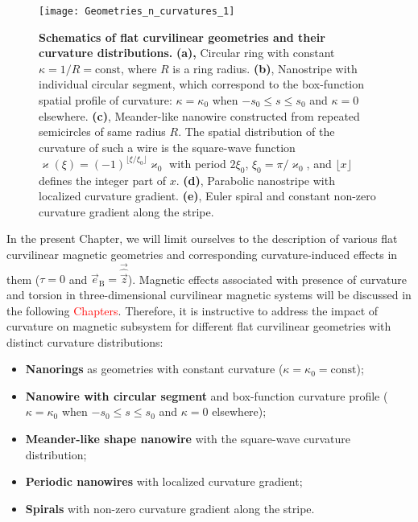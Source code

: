 \begin{figure}[t]
	\texttt{[image: Geometries\_n\_curvatures\_1]}
	\caption{\label{fig:Geometries_n_curvatures}%
		\textbf{Schematics of flat curvilinear geometries and their curvature distributions.} \textbf{(a),} Circular ring with constant $\kappa = 1/R = \textrm{const}$, where $R$ is a ring radius. \textbf{(b)}, Nanostripe with individual circular segment, which correspond to the box-function spatial profile of curvature: $\kappa = \kappa_0$ when $-s_0\leq s \leq s_0$ and $\kappa = 0$ elsewhere. \textbf{(c)}, Meander-like nanowire constructed from repeated semicircles of same radius $R$. The spatial distribution of the curvature of such a wire is the square-wave function $\varkappa(\xi) = (-1)^{\lfloor\xi/\xi_0\rfloor}\varkappa_0$ with period $2\xi_0$, $\xi_0=\pi/\varkappa_0$, and $\lfloor x \rfloor$ defines the integer part of $x$. \textbf{(d)}, Parabolic nanostripe with localized curvature gradient. \textbf{(e)}, Euler spiral and constant non-zero curvature gradient along the stripe. }
\end{figure}

In the present Chapter, we will limit ourselves to the description of various flat curvilinear magnetic geometries and corresponding curvature-induced effects in them ($\tau=0$ and $\vec{e}_\textrm{B} = \vec{\hat{\vec{z}}}$). Magnetic effects associated with presence of curvature and torsion in three-dimensional curvilinear magnetic systems will be discussed in the following \textcolor{red}{Chapters}. Therefore, it is instructive to address the impact of curvature on magnetic subsystem for different flat curvilinear geometries with distinct curvature distributions:
\begin{itemize}
	\item \textbf{Nanorings} as geometries with constant curvature ($\kappa = \kappa_0 = \textrm{const}$);
	\item \textbf{Nanowire with circular segment} and box-function curvature profile ($\kappa = \kappa_0$ when $-s_0\leq s \leq s_0$ and $\kappa = 0$ elsewhere);
	\item \textbf{Meander-like shape nanowire} with the square-wave curvature distribution;
	\item \textbf{Periodic nanowires} with localized curvature gradient;
	\item \textbf{Spirals} with non-zero curvature gradient along the stripe.
\end{itemize}



